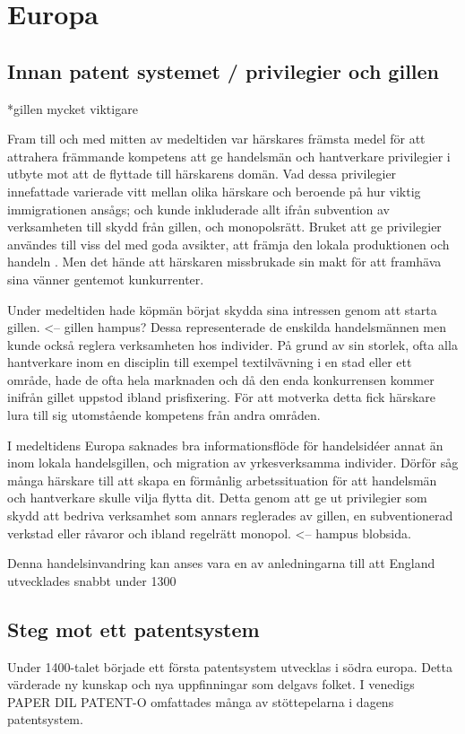 \section{Europa}

\subsection{Innan patent systemet / privilegier och gillen} %
\label{sub:innan_patent_systemet}
*gillen mycket viktigare

Fram till och med mitten av medeltiden var härskares främsta medel för att
attrahera främmande kompetens att ge handelsmän och hantverkare privilegier i
utbyte mot att de flyttade till härskarens domän. 
Vad dessa privilegier innefattade varierade vitt mellan olika härskare och
beroende på hur viktig immigrationen ansågs; och kunde inkluderade allt ifrån
subvention av verksamheten till skydd från gillen, och monopolsrätt. 
Bruket att ge privilegier användes till viss del med goda avsikter, att främja
den lokala produktionen och handeln \cite{nard}. Men det hände att härskaren
missbrukade sin makt för att framhäva sina vänner gentemot kunkurrenter.

Under medeltiden hade köpmän börjat skydda sina intressen genom att starta
gillen. <-- gillen hampus?
Dessa representerade de enskilda handelsmännen men kunde också reglera
verksamheten hos individer.
På grund av sin storlek, ofta alla hantverkare inom en disciplin till exempel
textilvävning i en stad eller ett område, hade de ofta hela marknaden och då
den enda konkurrensen kommer inifrån gillet uppstod ibland prisfixering. 
För att motverka detta fick härskare lura till sig utomstående kompetens från
andra områden.

I medeltidens Europa saknades bra informationsflöde för handelsidéer annat än
inom lokala handelsgillen, och migration av yrkesverksamma individer. 
Dörför såg många härskare till att skapa en förmånlig arbetssituation för att
handelsmän och hantverkare skulle vilja flytta dit. 
Detta genom att ge ut privilegier som skydd att bedriva verksamhet som annars
reglerades av gillen, en subventionerad verkstad eller råvaror och ibland
regelrätt monopol. <-- hampus blobsida. 

Denna handelsinvandring kan anses vara en av anledningarna till att England
utvecklades snabbt under 1300


\subsection{Steg mot ett patentsystem} %
\label{sub:steg_mot_ett_patent_system}
Under 1400-talet började ett första patentsystem utvecklas i södra europa. 
Detta värderade ny kunskap och nya uppfinningar som delgavs folket. 
I venedigs PAPER DIL PATENT-O omfattades många av stöttepelarna i dagens patentsystem. 


